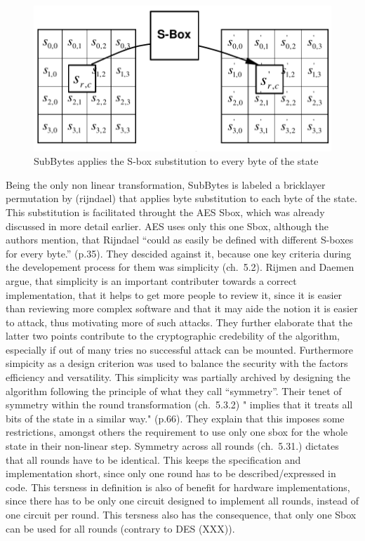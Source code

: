 \begin{figure}
\centering
\includegraphics[scale = 0.4]{data/figures/subbytes.png}
\caption{SubBytes applies the S-box substitution to every byte of the
state}
\end{figure}

Being the only non linear transformation, SubBytes is labeled a
bricklayer permutation by (rijndael) that applies byte substitution to
each byte of the state. This substitution is facilitated throught the
AES Sbox, which was already discussed in more detail earlier. AES uses
only this one Sbox, although the authors mention, that Rijndael ``could
as easily be defined with different S-boxes for every byte.'' (p.35).
They descided against it, because one key criteria during the
developement process for them was simplicity (ch.~5.2). Rijmen and
Daemen argue, that simplicity is an important contributer towards a
correct implementation, that it helps to get more people to review it,
since it is easier than reviewing more complex software and that it may
aide the notion it is easier to attack, thus motivating more of such
attacks. They further elaborate that the latter two points contribute to
the cryptographic credebility of the algorithm, especially if out of
many tries no successful attack can be mounted. Furthermore simpicity as
a design criterion was used to balance the security with the factors
efficiency and versatility. This simplicity was partially archived by
designing the algorithm following the principle of what they call
``symmetry''. Their tenet of symmetry within the round transformation
(ch.~5.3.2) " implies that it treats all bits of the state in a similar
way." (p.66). They explain that this imposes some restrictions, amongst
others the requirement to use only one sbox for the whole state in their
non-linear step. Symmetry across all rounds (ch.~5.31.) dictates that
all rounds have to be identical. This keeps the specification and
implementation short, since only one round has to be described/expressed
in code. This tersness in definition is also of benefit for hardware
implementations, since there has to be only one circuit designed to
implement all rounds, instead of one circuit per round. This tersness
also has the consequence, that only one Sbox can be used for all rounds
(contrary to DES (XXX)).

